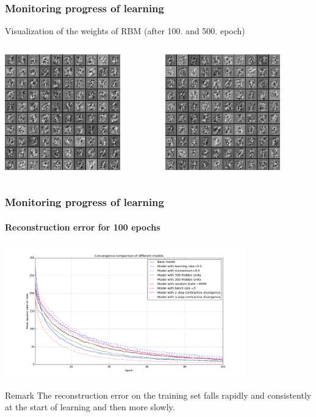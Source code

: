 \documentclass{beamer}
\begin{document}
  \begin{frame}
  \frametitle{Monitoring progress of learning}
   Visualization of the weights of RBM (after 100. and 500. epoch)
   \begin{columns}
		\begin{column}{0.5\textwidth}
            \includegraphics[width=5cm]{images/filtry_100epoch_50train.png}
		\end{column}
		\begin{column}{0.5\textwidth}
			\includegraphics[width=5cm]{images/filters_epoch500_train50.png}
		\end{column}
    \end{columns}
  \end{frame}
  \begin{frame}[plain]
  \frametitle{Monitoring progress of learning}
  \framesubtitle{Reconstruction error for 100 epochs}
    \includegraphics[width=10.5cm]{images/Plot_Convergence50train100epochs.png}
    \begin{alertblock}{Remark}
	The reconstruction error on the training set falls rapidly and consistently at the start of learning and then more slowly.
	\end{alertblock}
  \end{frame}
\end{document}
